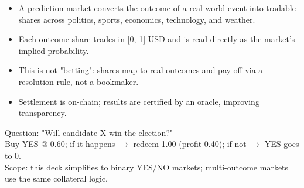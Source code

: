 \begin{frame}[t]
\par{}
\begin{pmbody}
\begin{itemize}\pmspreaditems
  \item A prediction market converts the outcome of a real-world event into tradable shares across politics, sports, economics, technology, and weather.
  \item Each outcome share trades in [0, 1] USD and is read directly as the market's implied probability.
  \item This is not "betting": shares map to real outcomes and pay off via a resolution rule, not a bookmaker.
  \item Settlement is on-chain; results are certified by an oracle, improving transparency.
\end{itemize}
\begin{pmcallout}
  Question: "Will candidate X win the election?" \quad [ YES ]\quad [ NO ] \\
  Buy YES @ 0.60; if it happens $\to$ redeem 1.00 (profit 0.40); if not $\to$ YES goes to 0. \\
  \textcolor{pmGrey}{\fontsize{12}{16}\selectfont Scope: this deck simplifies to binary YES/NO markets; multi-outcome markets use the same collateral logic.}
\end{pmcallout}
\end{pmbody}
\end{frame}


